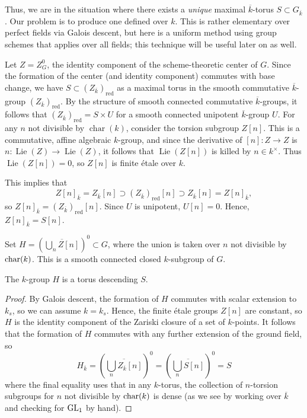 \documentclass[10pt]{article}
\renewcommand{\(}{\left(}
\renewcommand{\)}{\right)}
\numberwithin{thm}{subsection}
\begin{document}
Thus, we are in the situation where 
there exists a \textit{unique} maximal $\overline{k}$-torus $S\subset G_{\overline{k}}$. Our problem is to produce one defined over $k$.  This is rather elementary over perfect fields via
Galois descent, but here is a uniform
method using group schemes that applies over all fields; this technique will
be useful later on as well. 

Let $Z=Z_G^0$, the identity component of the scheme-theoretic center of $G$.
Since the formation of the center (and identity component) commutes with base change,
we have $S\subset (Z_{\overline{k}})_{\mathrm{red}}$ 
as a maximal torus in the smooth commutative $\overline{k}$-group
$(Z_{\overline{k}})_{\mathrm{red}}$.
By the structure of smooth connected commutative $\overline{k}$-groups, 
it follows
that $(Z_{\overline{k}})_{\mathrm{red}}=S\times U$
for a smooth connected unipotent $\overline{k}$-group $U$.
For any $n$ not divisible by $\operatorname{char}(k)$,
consider the torsion subgroup $Z[n]$.
This is a commutative, affine algebraic $k$-group,
and since the derivative of $[n]:Z\rightarrow Z$
is $n:\operatorname{Lie}(Z)\rightarrow\operatorname{Lie}(Z)$,
it follows that $\operatorname{Lie}(Z[n])$ is killed by $n \in k^{\times}$.
Thus $\operatorname{Lie}(Z[n])= 0$, so $Z[n]$ is finite \'etale over $k$.

This implies that 
\[Z[n]_{\overline{k}}=Z_{\overline{k}}[n]
\supset (Z_{\overline{k}})_{\mathrm{red}}[n]
\supset Z_{\overline{k}}[n]=Z[n]_{\overline{k}},\]
so $Z[n]_{\overline{k}}=(Z_{\overline{k}})_{\mathrm{red}}[n]$.
Since $U$ is unipotent, $U[n] = 0$. 
Hence, $Z[n]_{\overline{k}}=S[n]$.

Set $H=(\overline{\bigcup_n Z[n]})^0\subset G$,
where the union is taken over $n$ not divisible by ${\rm{char}}(k)$. This 
is a smooth connected closed $k$-subgroup of $G$. 

\begin{lemma}\label{tordescent}
The $k$-group $H$ is a torus descending $S$.
\end{lemma}

\begin{proof}
By Galois descent, the formation of $H$ commutes with scalar extension to
$k_s$, so we can assume $k = k_s$.  Hence, the finite \'etale groups $Z[n]$ are constant, so
$H$ is the identity component of the Zariski closure of a set of $k$-points.
It follows that the formation of $H$ 
commutes with any further extension of the ground field, so 
$$H_{\overline{k}}=(\overline{\bigcup_{n} Z_{\overline{k}}[n]})^0
=(\overline{\bigcup_{n} S[n]})^0=S$$
where the final equality uses that in any $k$-torus, the collection of $n$-torsion subgroups
for $n$ not divisible by ${\rm{char}}(k)$ is dense (as
we see by working over $\overline{k}$ and checking for ${\rm{GL}}_1$ by hand). 
\end{proof}
\end{document}
